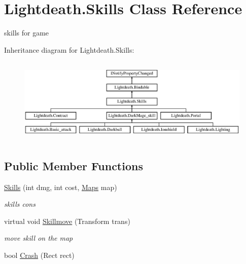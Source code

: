\hypertarget{class_lightdeath_1_1_skills}{}\section{Lightdeath.\+Skills Class Reference}
\label{class_lightdeath_1_1_skills}


skills for game  


Inheritance diagram for Lightdeath.\+Skills\+:\begin{figure}[H]
\begin{center}
\leavevmode
\includegraphics[height=4.142012cm]{class_lightdeath_1_1_skills}
\end{center}
\end{figure}
\subsection*{Public Member Functions}
\begin{DoxyCompactItemize}
\item 
\hyperlink{class_lightdeath_1_1_skills_abdc62cb76dd44b2706e9bf8810174403}{Skills} (int dmg, int cost, \hyperlink{class_lightdeath_1_1_maps}{Maps} map)
\begin{DoxyCompactList}\small\item\em skills cons \end{DoxyCompactList}\item 
virtual void \hyperlink{class_lightdeath_1_1_skills_a744fee585abda76560f2ca9dcce19cd0}{Skillmove} (Transform trans)
\begin{DoxyCompactList}\small\item\em move skill on the map \end{DoxyCompactList}\item 
bool \hyperlink{class_lightdeath_1_1_skills_a40453efe39eee3cfbdc85d62e31f4b2a}{Crash} (Rect rect)
\end{DoxyCompactItemize}
